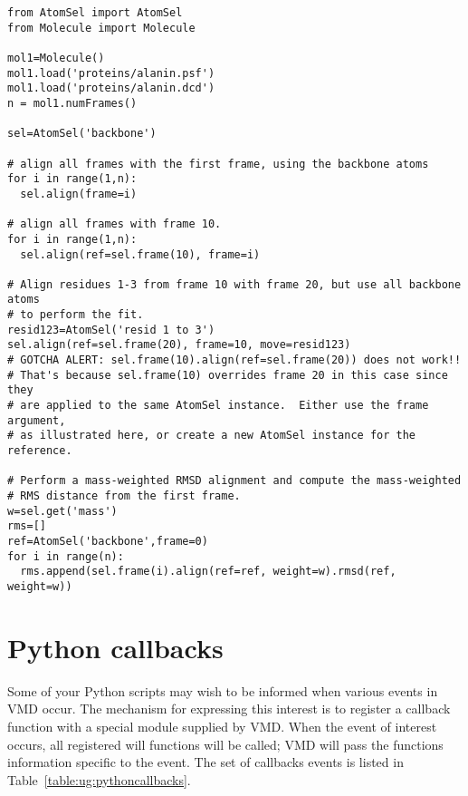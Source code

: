 \begin{verbatim}
from AtomSel import AtomSel
from Molecule import Molecule

mol1=Molecule()
mol1.load('proteins/alanin.psf')
mol1.load('proteins/alanin.dcd')
n = mol1.numFrames()

sel=AtomSel('backbone')

# align all frames with the first frame, using the backbone atoms
for i in range(1,n):
  sel.align(frame=i)

# align all frames with frame 10.
for i in range(1,n):
  sel.align(ref=sel.frame(10), frame=i)

# Align residues 1-3 from frame 10 with frame 20, but use all backbone atoms
# to perform the fit.
resid123=AtomSel('resid 1 to 3')
sel.align(ref=sel.frame(20), frame=10, move=resid123)
# GOTCHA ALERT: sel.frame(10).align(ref=sel.frame(20)) does not work!!
# That's because sel.frame(10) overrides frame 20 in this case since they
# are applied to the same AtomSel instance.  Either use the frame argument,
# as illustrated here, or create a new AtomSel instance for the reference.

# Perform a mass-weighted RMSD alignment and compute the mass-weighted 
# RMS distance from the first frame.
w=sel.get('mass')
rms=[]
ref=AtomSel('backbone',frame=0)
for i in range(n):
  rms.append(sel.frame(i).align(ref=ref, weight=w).rmsd(ref, weight=w))

\end{verbatim}

\section{Python callbacks}

Some of your Python scripts may wish to be informed when various events in VMD 
occur.  The mechanism for expressing this interest is to register a callback
function with a special module supplied by VMD.  When the event of interest
occurs, all registered will functions will be called; VMD will pass the
functions information specific to the event.  The set of callbacks events 
is listed in Table~\ref{table:ug:pythoncallbacks}.

